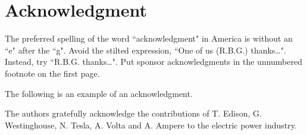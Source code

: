 \documentclass[conference]{IEEEtran}
\begin{document}
%





\section*{Acknowledgment}

The preferred spelling of the word ``acknowledgment" in America is without an ``e" after the ``g". Avoid the stilted expression, ``One of us (R.B.G.) thanks\ldots". Instead, try ``R.B.G. thanks\ldots". Put sponsor acknowledgments in the unnumbered footnote on the first page.

The following is an example of an acknowledgment.

The authors gratefully acknowledge the contributions of T. Edison, G. Westinghouse, N. Tesla, A. Volta and A. Ampere to the electric power industry.

\end{document}
